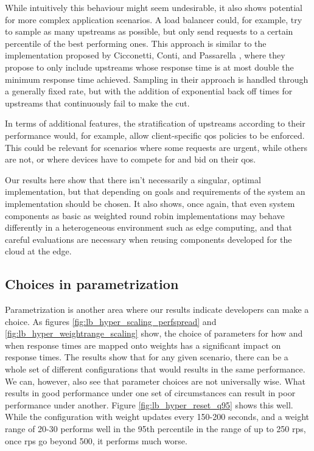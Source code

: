 While intuitively this behaviour might seem undesirable, it also shows potential for more complex application scenarios.
A load balancer could, for example, try to sample as many upstreams as possible, but only send requests to a certain percentile of the best performing ones.
This approach is similar to the implementation proposed by Cicconetti, Conti, and Passarella \cite{cicconettiDecentralizedFrameworkServerless2020}, where they propose to only include upstreams whose response time is at most double the minimum response time achieved.
Sampling in their approach is handled through a generally fixed rate, but with the addition of exponential back off times for upstreams that continuously fail to make the cut.

In terms of additional features, the stratification of upstreams according to their performance would, for example, allow client-specific \gls{qos} policies to be enforced.
This could be relevant for scenarios where some requests are urgent, while others are not, or where devices have to compete for and bid on their \gls{qos}.

Our results here show that there isn't necessarily a singular, optimal implementation, but that depending on goals and requirements of the system an implementation should be chosen.
It also shows, once again, that even system components as basic as weighted round robin implementations may behave differently in a heterogeneous environment such as edge computing, and that careful evaluations are necessary when reusing components developed for the cloud at the edge.

\subsection{Choices in parametrization}
Parametrization is another area where our results indicate developers can make a choice.
As figures \ref{fig:lb_hyper_scaling_perfspread} and \ref{fig:lb_hyper_weightrange_scaling} show, the choice of parameters for how and when response times are mapped onto weights has a significant impact on response times.
The results show that for any given scenario, there can be a whole set of different configurations that would results in the same performance.
We can, however, also see that parameter choices are not universally wise.
What results in good performance under one set of circumstances can result in poor performance under another.
Figure \ref{fig:lb_hyper_reset_q95} shows this well.
While the configuration with weight updates every 150-200 seconds, and a weight range of 20-30 performs well in the 95th percentile in the range of up to 250 \gls{rps}, once \gls{rps} go beyond 500, it performs much worse.

